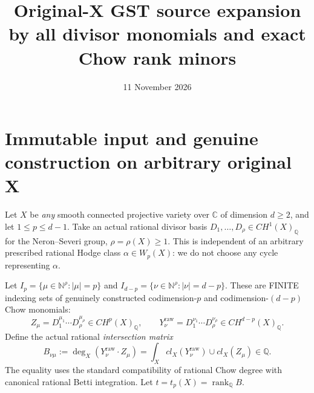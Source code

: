 \documentclass[11pt]{article}
\title{Original-X GST source expansion by all divisor monomials and exact Chow rank minors}
\date{11 November 2026}
\begin{document}
\maketitle

\section{Immutable input and genuine construction on arbitrary original X}

Let $X$ be \emph{any} smooth connected projective variety over $\mathbb C$
of dimension $d\ge2$, and let $1\le p\le d-1$.
Take an actual rational divisor basis
$D_1,\ldots,D_\rho\in CH^1(X)_{\mathbb Q}$
for the Neron--Severi group, $\rho=\rho(X)\ge1$.
This is independent of an arbitrary prescribed rational Hodge class
$\alpha\in W_p(X)$: we do not choose any cycle representing $\alpha$.

Let $I_p=\{\mu\in\mathbb N^\rho:|\mu|=p\}$ and
$I_{d-p}=\{\nu\in\mathbb N^\rho:|\nu|=d-p\}$.
These are FINITE indexing sets of genuinely constructed
codimension-$p$ and codimension-$(d-p)$ Chow monomials:
\[
Z_\mu=D_1^{\mu_1}\cdots D_\rho^{\mu_\rho}
\in CH^p(X)_{\mathbb Q},
\qquad
Y_\nu^{\mathrm{raw}}=D_1^{\nu_1}\cdots D_\rho^{\nu_\rho}
\in CH^{d-p}(X)_{\mathbb Q}.
\]
Define the actual rational \emph{intersection matrix}
\[
B_{\nu\mu}:=\deg_X(Y_\nu^{\mathrm{raw}}\cdot Z_\mu)
=\int_X cl_X(Y_\nu^{\mathrm{raw}})\cup cl_X(Z_\mu)
\in\mathbb Q.
\]
The equality uses the standard compatibility of rational Chow degree
with canonical rational Betti integration. Let
$t=t_p(X)=\operatorname{rank}_{\mathbb Q}B$.
\end{document}
